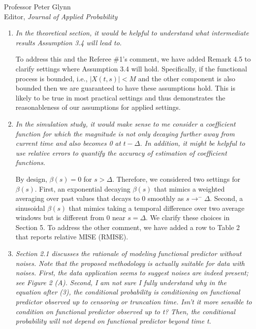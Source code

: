 \documentclass[11pt]{letter} %
\begin{document}
\begin{letter}{Professor
	Peter Glynn\\
	Editor, {\em Journal of Applied Probability}}
\begin{enumerate}
\vspace{5mm}
We now clarify that throughout the simulation studies and application we employ the penalization procedure to reduce overfitting.  We have found that without careful tuning of the penalty parameter, the overfitting can be severe as stated by the referee.
\vspace{5mm}

\item {\it In the theoretical section, it would be helpful to understand what intermediate results Assumption 3.4 will lead to.}

\vspace{5mm}
To address this and the Referee \#1's comment, we have added Remark 4.5 to clarify settings where Assumption 3.4 will hold. Specifically, if the functional process is bounded, i.e., $|X(t,s)| < M$ and the other component is also bounded then we are guaranteed to have these assumptions hold.  This is likely to be true in most practical settings and thus demonstrates the reasonableness of our assumptions for applied settings.
\vspace{5mm}

\item {\it In the simulation study, it would make sense to me consider a coefficient function for which the magnitude is not only decaying further away from current time and also becomes 0 at $t-\Delta$. In addition, it might be helpful to use relative errors to quantify the accuracy of estimation of coefficient functions.}

\vspace{5mm}
By design, $\beta(s) = 0$ for $s > \Delta$.  Therefore, we considered two settings for~$\beta(s)$. First, an exponential decaying $\beta(s)$ that mimics a weighted averaging over past values that decays to $0$ smoothly as $s \to^- \Delta$. Second, a sinusoidal $\beta(s)$ that mimics taking a temporal difference over two average windows but is different from $0$ near $s =\Delta$.   We clarify these choices in Section 5. To address the other comment, we have added a row to Table 2 that reports relative MISE (RMISE).
\vspace{5mm}

\item {\it Section 2.1 discusses the rationale of modeling functional predictor without noises. Note that the proposed methodology is actually suitable for data with noises. First, the data application seems to suggest noises are indeed present; see Figure 2 (A). Second, I am not sure I fully understand why in the equation after (3), the conditional probability is conditioning on functional predictor observed up to censoring or truncation time. Isn’t it more sensible to condition on functional predictor observed up to t? Then, the conditional probability will not depend on functional predictor beyond time t.}


\end{enumerate}
\end{letter}
\end{document}
